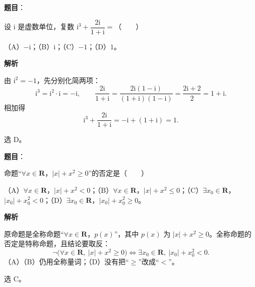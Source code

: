 

\begin{answer}

\textbf{题目}：

设 $\mathrm i$ 是虚数单位，复数 $\mathrm i^3+\dfrac{2\mathrm i}{1+\mathrm i}=$\mbox{（　　）}

（A）$-\mathrm i$；（B）$\mathrm i$；（C）$-1$；（D）$1$。

\textbf{解析}

由 $\mathrm i^2=-1$，先分别化简两项：
\nopagebreak[4]
\[\mathrm i^3=\mathrm i^2\cdot\mathrm i=-\mathrm i,\qquad
\frac{2\mathrm i}{1+\mathrm i}=\frac{2\mathrm i(1-\mathrm i)}{(1+\mathrm i)(1-\mathrm i)}=\frac{2\mathrm i+2}{2}=1+\mathrm i .\]
相加得
\nopagebreak[4]
\[\mathrm i^3+\frac{2\mathrm i}{1+\mathrm i}=-\mathrm i+(1+\mathrm i)=1 .\]

选 D。


\end{answer}
\begin{answer}

\textbf{题目}：

命题“$\forall x\in\mathbf R$，$|x|+x^2\geqslant0$”的否定是\mbox{（　　）}

（A）$\forall x\in\mathbf R$，$|x|+x^2<0$；（B）$\forall x\in\mathbf R$，$|x|+x^2\leqslant0$；（C）$\exists x_0\in\mathbf R$，$|x_0|+x_0^2<0$；（D）$\exists x_0\in\mathbf R$，$|x_0|+x_0^2\geqslant0$。

\textbf{解析}

原命题是全称命题“$\forall x\in\mathbf R$，$p(x)$”，其中 $p(x)$ 为 $|x|+x^2\geqslant0$。全称命题的否定是特称命题，且结论要取反：
\nopagebreak[4]
\[\neg\bigl(\forall x\in\mathbf R,\ |x|+x^2\geqslant0\bigr)
\iff \exists x_0\in\mathbf R,\ |x_0|+x_0^2<0 .\]
（A）（B）仍用全称量词；（D）没有把“$\geqslant$”改成“$<$”。

选 C。


\end{answer}
